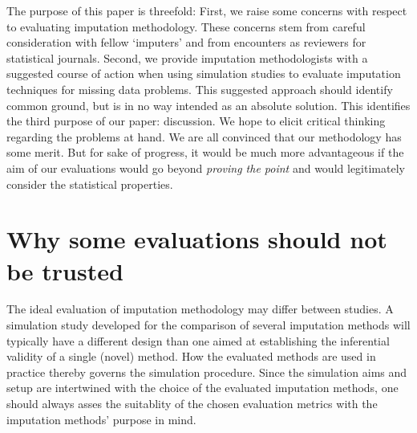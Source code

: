 \documentclass[bimj,fleqn]{w-art}
\begin{document}

The purpose of this paper is threefold: First, we raise some concerns with respect to evaluating imputation methodology. These concerns stem from careful consideration with fellow `imputers' and from encounters as reviewers for statistical journals. Second, we provide imputation methodologists with a suggested course of action when using simulation studies to evaluate imputation techniques for missing data problems. This suggested approach should identify common ground, but is in no way intended as an absolute solution. This identifies the third purpose of our paper: discussion. We hope to elicit critical thinking regarding the problems at hand. We are all convinced that our methodology has some merit. But for sake of progress, it would be much more advantageous if the aim of our evaluations would go beyond \textit{proving the point} and would legitimately consider the statistical properties. 


\section{Why some evaluations should not be trusted}


The ideal evaluation of imputation methodology may differ between studies. A simulation study developed for the comparison of several imputation methods will typically have a different design than one aimed at establishing the inferential validity of a single (novel) method. How the evaluated methods are used in practice thereby governs the simulation procedure. Since the simulation aims and setup are intertwined with the choice of the evaluated imputation methods, one should always asses the suitablity of the chosen evaluation metrics with the imputation methods' purpose in mind. 
\end{document}
